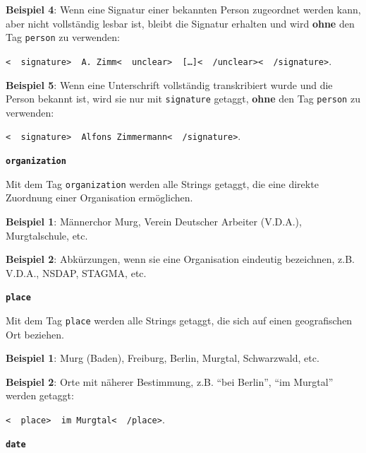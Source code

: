\documentclass[12pt, a4paper, ngerman, bidi=default]{article}
\begin{document}
\begin{description}
\begin{description}
    \textbf{ Beispiel 4}: Wenn eine Signatur einer bekannten Person zugeordnet werden kann, aber nicht vollständig lesbar ist, bleibt die Signatur erhalten und wird \textbf{ohne} den Tag \texttt{\colorbox{person}{person}} zu verwenden: 

    \colorbox{VeryLightGray}{\texttt{\textless\ \  signature\textgreater\ \  A. Zimm\textless\ \  unclear\textgreater\ \  [\ldots]\textless\ \  /unclear\textgreater\textless\ \  /signature\textgreater}.} 
    
    \textbf{ Beispiel 5}: Wenn eine Unterschrift vollständig transkribiert wurde und die Person bekannt ist, wird sie nur mit \texttt{\colorbox{signature}{signature}} getaggt, \textbf{ohne} den Tag \texttt{\colorbox{person}{person}} zu verwenden:  

    \colorbox{VeryLightGray}{\texttt{\textless\ \  signature\textgreater\ \  Alfons Zimmermann\textless\ \  /signature\textgreater}.} 
    
    \item\texttt{\textbf{{\colorbox{organization}{organization}}}}
        
    Mit dem Tag \texttt{\colorbox{organization}{organization}} werden alle Strings getaggt, die eine direkte Zuordnung einer Organisation ermöglichen.  
    
    \noindent \textbf{ Beispiel 1}: Männerchor Murg, Verein Deutscher Arbeiter (V.D.A.), Murgtalschule, etc.

    \textbf{ Beispiel 2}: Abkürzungen, wenn sie eine Organisation eindeutig bezeichnen, z.B. V.D.A., NSDAP, STAGMA, etc.
    

    \item\texttt{\textbf{{\colorbox{place}{place}}}}
        
    Mit dem Tag \texttt{\colorbox{place}{place}} werden alle Strings getaggt, die sich auf einen geografischen Ort beziehen.  
    
    \noindent \textbf{ Beispiel 1}: Murg (Baden), Freiburg, Berlin, Murgtal, Schwarzwald, etc.

    \textbf{ Beispiel 2}: Orte mit näherer Bestimmung, z.B. \enquote{bei Berlin}, \enquote{im Murgtal} werden getaggt:  

    \colorbox{VeryLightGray}{\texttt{\textless\ \  place\textgreater\ \  im Murgtal\textless\ \  /place\textgreater}.} 

    
    \item\texttt{\textbf{{\colorbox{date}{date}}}}
        

\end{description}
\end{description}
\end{document}
